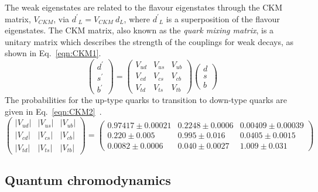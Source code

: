 The weak eigenstates are related to the flavour eigenstates through the CKM matrix, $V_{CKM}$, via ${d^{\prime}}_L = V_{CKM}~d_L$, where ${d^{\prime}}_L$ is a superposition of the flavour eigenstates. The CKM matrix, also known as the \emph{quark mixing matrix}, is a unitary matrix which describes the strength of the couplings for weak decays, as shown in Eq.~\ref{eqn:CKM1}. 
\begin{equation}
\label{eqn:CKM1}
{\begin{pmatrix}
d^{\prime }\\
s^{\prime }\\
b^{\prime }
\end{pmatrix}}
=
{\begin{pmatrix}
V_{ud}&V_{us}&V_{ub}\\
V_{cd}&V_{cs}&V_{cb}\\
V_{td}&V_{ts}&V_{tb}
\end{pmatrix}}
{\begin{pmatrix}d\\s\\b
\end{pmatrix}}
\end{equation}
The probabilities for the up-type quarks to transition to down-type quarks are given in Eq.~\ref{eqn:CKM2}~\cite{PDG2016}.
\begin{equation}
\label{eqn:CKM2}
{\begin{pmatrix}
|V_{ud}|&|V_{us}|&|V_{ub}|\\|V_{cd}|&|V_{cs}|&|V_{cb}|\\|V_{td}|&|V_{ts}|&|V_{tb}|
\end{pmatrix}}
=
{\begin{pmatrix}0.97417\pm 0.00021 & 0.2248\pm 0.0006 & 0.00409\pm{0.00039}\\
0.220\pm 0.005 & 0.995\pm 0.016 & 0.0405\pm{0.0015}\\
0.0082\pm{0.0006} & 0.040\pm{0.0027}&1.009\pm0.031
\end{pmatrix}}
\end{equation}



\subsection{Quantum chromodynamics}

